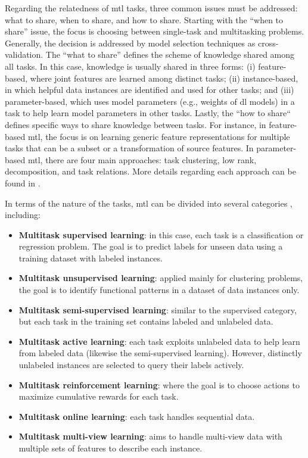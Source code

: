 Regarding the relatedness of \acs{mtl} tasks, three common issues must be addressed: what to share, when to share, and how to share. Starting with the ``when to share'' issue, the focus is choosing between single-task and multitasking problems. Generally, the decision is addressed by model selection techniques as cross-validation. The ``what to share'' defines the scheme of knowledge shared among all tasks. In this case, knowledge is usually shared in three forms: (i) feature-based, where joint features are learned among distinct tasks; (ii) instance-based, in which helpful data instances are identified and used for other tasks; and (iii) parameter-based, which uses model parameters (e.g., weights of \acl{dl} models) in a task to help learn model parameters in other tasks. Lastly, the ``how to share`` defines specific ways to share knowledge between tasks. For instance, in feature-based \acs{mtl}, the focus is on learning generic feature representations for multiple tasks that can be a subset or a transformation of source features. In parameter-based \acs{mtl}, there are four main approaches: task clustering, low rank, decomposition, and task relations. More details regarding each approach can be found in \citep{zhang2017survey}.

In terms of the nature of the tasks, \acl{mtl} can be divided into several categories \citep{zhang2018overview}, including:

\begin{itemize}
\item \textbf{Multitask supervised learning}: in this case, each task is a classification or regression problem. The goal is to predict labels for unseen data using a training dataset with labeled instances.

\item \textbf{Multitask unsupervised learning}: applied mainly for clustering problems, the goal is to identify functional patterns in a dataset of data instances only.

\item \textbf{Multitask semi-supervised learning}: similar to the supervised category, but each task in the training set contains labeled and unlabeled data.

\item \textbf{Multitask active learning}: each task exploits unlabeled data to help learn from labeled data (likewise the semi-supervised learning). However, distinctly unlabeled instances are selected to query their labels actively.

\item \textbf{Multitask reinforcement learning}: where the goal is to choose actions to maximize cumulative rewards for each task.

\item \textbf{Multitask online learning}: each task handles sequential data.

\item \textbf{Multitask multi-view learning}: aims to handle multi-view data with multiple sets of features to describe each instance.
\end{itemize}

